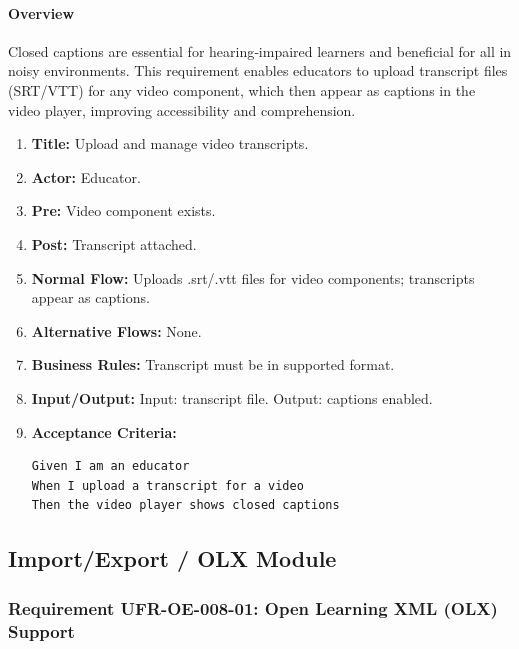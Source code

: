 \paragraph{Overview}
Closed captions are essential for hearing‑impaired learners and beneficial for all in noisy environments. This requirement enables educators to upload transcript files (SRT/VTT) for any video component, which then appear as captions in the video player, improving accessibility and comprehension.
\begin{enumerate}[label=\textbf{\arabic*.}]
\item \textbf{Title:} Upload and manage video transcripts.
\item \textbf{Actor:} Educator.
\item \textbf{Pre:} Video component exists.
\item \textbf{Post:} Transcript attached.
\item \textbf{Normal Flow:} Uploads .srt/.vtt files for video components; transcripts appear as captions.
\item \textbf{Alternative Flows:} None.
\item \textbf{Business Rules:} Transcript must be in supported format.
\item \textbf{Input/Output:} Input: transcript file. Output: captions enabled.
\item \textbf{Acceptance Criteria:}
    \begin{verbatim}
Given I am an educator
When I upload a transcript for a video
Then the video player shows closed captions
    \end{verbatim}
\end{enumerate}

\subsection{Import/Export / OLX Module}
\subsubsection{Requirement UFR-OE-008-01: Open Learning XML (OLX) Support}
